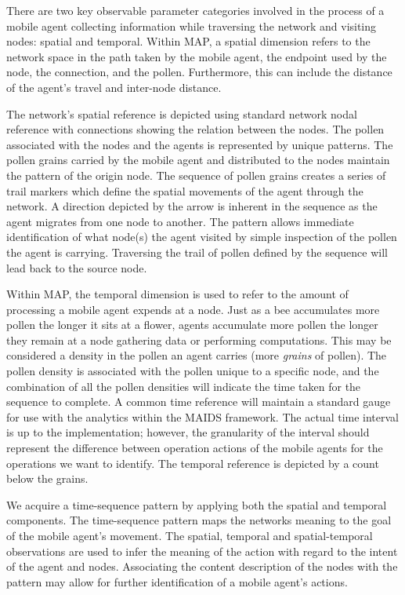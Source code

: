 \documentclass{acm_proc_article-sp}
\begin{document}
There are two key observable parameter categories involved in the process of a mobile agent collecting information while traversing the network and visiting nodes: spatial and temporal.  Within MAP, a spatial dimension refers to the network space in the path taken by the mobile agent, the endpoint used by the node, the connection, and the pollen.  Furthermore, this can include the distance of the agent's travel and inter-node distance.

The network's spatial reference is depicted using standard network nodal reference with connections showing the relation between the nodes.  The pollen associated with the nodes and the agents is represented by unique patterns.  The pollen grains carried by the mobile agent and distributed to the nodes maintain the pattern of the origin node.  The sequence of pollen grains creates a series of trail markers which define the spatial movements of the agent through the network.  A direction depicted by the arrow is inherent in the sequence as the agent migrates from one node to another.  The pattern allows immediate identification of what node(s) the agent visited by simple inspection of the pollen the agent is carrying.  Traversing the trail of pollen defined by the sequence will lead back to the source node.

Within MAP, the temporal dimension is used to refer to the amount of processing a mobile agent expends at a node.  Just as a bee accumulates more pollen the longer it sits at a flower, agents accumulate more pollen the longer they remain at a node gathering data or performing computations.  This may be considered a density in the pollen an agent carries (more {\it grains} of pollen).  The pollen density is associated with the pollen unique to a specific node, and the combination of all the pollen densities will indicate the time taken for the sequence to complete.  A common time reference will maintain a standard gauge for use with the analytics within the MAIDS framework.  The actual time interval is up to the implementation; however, the granularity of the interval should represent the difference between operation actions of the mobile agents for the operations we want to identify.  The temporal reference is depicted by a count below the grains.

We acquire a time-sequence pattern by applying both the spatial and temporal components.  The time-sequence pattern maps the networks meaning to the goal of the mobile agent's movement.  The spatial, temporal and spatial-temporal observations are used to infer the meaning of the action with regard to the intent of the agent and nodes.  Associating the content description of the nodes with the pattern may allow for further identification of a mobile agent's actions.
\end{document}
